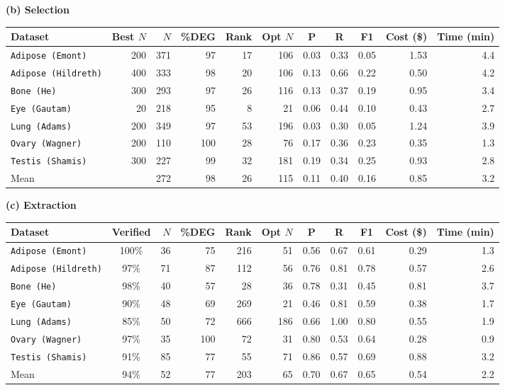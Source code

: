 \documentclass[10pt,twocolumn]{article}
\theoremstyle{plain}
\theoremstyle{definition}
\theoremstyle{remark}
\begin{document}
\begin{table}[ht!]
  \vspace{8pt}
  \textbf{(b) Selection}
  \vspace{2pt}

  \begin{tabular}{@{}l r r rrr ccc r r@{}}
  \toprule
  Dataset & Best $N$ & $N$ & \%DEG & Rank & Opt $N$ & P & R & F1 & Cost (\$) & Time (min) \\
  \midrule
  \texttt{Adipose (Emont)}    & 200 & 371 &  97 & 17 & 106 & 0.03 & 0.33 & 0.05 & 1.53 &  4.4 \\
  \texttt{Adipose (Hildreth)} & 400 & 333 &  98 & 20 & 106 & 0.13 & 0.66 & 0.22 & 0.50 &  4.2 \\
  \texttt{Bone (He)}          & 300 & 293 &  97 & 26 & 116 & 0.13 & 0.37 & 0.19 & 0.95 &  3.4 \\
  \texttt{Eye (Gautam)}       &  20 & 218 &  95 &  8 &  21 & 0.06 & 0.44 & 0.10 & 0.43 &  2.7 \\
  \texttt{Lung (Adams)}       & 200 & 349 &  97 & 53 & 196 & 0.03 & 0.30 & 0.05 & 1.24 &  3.9 \\
  \texttt{Ovary (Wagner)}     & 200 & 110 & 100 & 28 &  76 & 0.17 & 0.36 & 0.23 & 0.35 &  1.3 \\
  \texttt{Testis (Shamis)}    & 300 & 227 &  99 & 32 & 181 & 0.19 & 0.34 & 0.25 & 0.93 &  2.8 \\
  \midrule
  Mean               &     & 272 &  98 & 26 & 115 & 0.11 & 0.40 & 0.16 & 0.85 &  3.2 \\
  \bottomrule
  \end{tabular}

  \vspace{8pt}
  \textbf{(c) Extraction}
  \vspace{2pt}

  \begin{tabular}{@{}l c r rrr ccc r r@{}}
  \toprule
  Dataset & Verified & $N$ & \%DEG & Rank & Opt $N$ & P & R & F1 & Cost (\$) & Time (min) \\
  \midrule
  \texttt{Adipose (Emont)}    & 100\% &  36 &  75 & 216 &  51 & 0.56 & 0.67 & 0.61 & 0.29 & 1.3 \\
  \texttt{Adipose (Hildreth)} &  97\% &  71 &  87 & 112 &  56 & 0.76 & 0.81 & 0.78 & 0.57 & 2.6 \\
  \texttt{Bone (He)}          &  98\% &  40 &  57 &  28 &  36 & 0.78 & 0.31 & 0.45 & 0.81 & 3.7 \\
  \texttt{Eye (Gautam)}       &  90\% &  48 &  69 & 269 &  21 & 0.46 & 0.81 & 0.59 & 0.38 & 1.7 \\
  \texttt{Lung (Adams)}       &  85\% &  50 &  72 & 666 & 186 & 0.66 & 1.00 & 0.80 & 0.55 & 1.9 \\
  \texttt{Ovary (Wagner)}     &  97\% &  35 & 100 &  72 &  31 & 0.80 & 0.53 & 0.64 & 0.28 & 0.9 \\
  \texttt{Testis (Shamis)}    &  91\% &  85 &  77 &  55 &  71 & 0.86 & 0.57 & 0.69 & 0.88 & 3.2 \\
  \midrule
  Mean               &  94\% &  52 & 77 & 203 & 65 & 0.70 & 0.67 & 0.65 & 0.54 &  2.2 \\
  \bottomrule
  \end{tabular}
\end{table}
\end{document}
